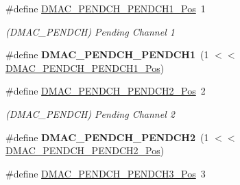 \begin{DoxyCompactItemize}
\item 
\hypertarget{group___s_a_m_l21___d_m_a_c_gad39b7a6253d67e4533c031d56bcf80b0}{}\#define \hyperlink{group___s_a_m_l21___d_m_a_c_gad39b7a6253d67e4533c031d56bcf80b0}{D\+M\+A\+C\+\_\+\+P\+E\+N\+D\+C\+H\+\_\+\+P\+E\+N\+D\+C\+H1\+\_\+\+Pos}~1\label{group___s_a_m_l21___d_m_a_c_gad39b7a6253d67e4533c031d56bcf80b0}

\begin{DoxyCompactList}\small\item\em (D\+M\+A\+C\+\_\+\+P\+E\+N\+D\+C\+H) Pending Channel 1 \end{DoxyCompactList}\item 
\hypertarget{group___s_a_m_l21___d_m_a_c_gaf4190219b39d90bedd4a56ab6ae60146}{}\#define {\bfseries D\+M\+A\+C\+\_\+\+P\+E\+N\+D\+C\+H\+\_\+\+P\+E\+N\+D\+C\+H1}~(1 $<$$<$ \hyperlink{group___s_a_m_l21___d_m_a_c_gad39b7a6253d67e4533c031d56bcf80b0}{D\+M\+A\+C\+\_\+\+P\+E\+N\+D\+C\+H\+\_\+\+P\+E\+N\+D\+C\+H1\+\_\+\+Pos})\label{group___s_a_m_l21___d_m_a_c_gaf4190219b39d90bedd4a56ab6ae60146}

\item 
\hypertarget{group___s_a_m_l21___d_m_a_c_ga67157f108f942dcda1112a71add5e63e}{}\#define \hyperlink{group___s_a_m_l21___d_m_a_c_ga67157f108f942dcda1112a71add5e63e}{D\+M\+A\+C\+\_\+\+P\+E\+N\+D\+C\+H\+\_\+\+P\+E\+N\+D\+C\+H2\+\_\+\+Pos}~2\label{group___s_a_m_l21___d_m_a_c_ga67157f108f942dcda1112a71add5e63e}

\begin{DoxyCompactList}\small\item\em (D\+M\+A\+C\+\_\+\+P\+E\+N\+D\+C\+H) Pending Channel 2 \end{DoxyCompactList}\item 
\hypertarget{group___s_a_m_l21___d_m_a_c_ga9c1646c7d84e8a5750b483410f59bb8f}{}\#define {\bfseries D\+M\+A\+C\+\_\+\+P\+E\+N\+D\+C\+H\+\_\+\+P\+E\+N\+D\+C\+H2}~(1 $<$$<$ \hyperlink{group___s_a_m_l21___d_m_a_c_ga67157f108f942dcda1112a71add5e63e}{D\+M\+A\+C\+\_\+\+P\+E\+N\+D\+C\+H\+\_\+\+P\+E\+N\+D\+C\+H2\+\_\+\+Pos})\label{group___s_a_m_l21___d_m_a_c_ga9c1646c7d84e8a5750b483410f59bb8f}

\item 
\hypertarget{group___s_a_m_l21___d_m_a_c_gaab6a540d960e9ebf33586e193f6eb3fe}{}\#define \hyperlink{group___s_a_m_l21___d_m_a_c_gaab6a540d960e9ebf33586e193f6eb3fe}{D\+M\+A\+C\+\_\+\+P\+E\+N\+D\+C\+H\+\_\+\+P\+E\+N\+D\+C\+H3\+\_\+\+Pos}~3\label{group___s_a_m_l21___d_m_a_c_gaab6a540d960e9ebf33586e193f6eb3fe}


\end{DoxyCompactItemize}
